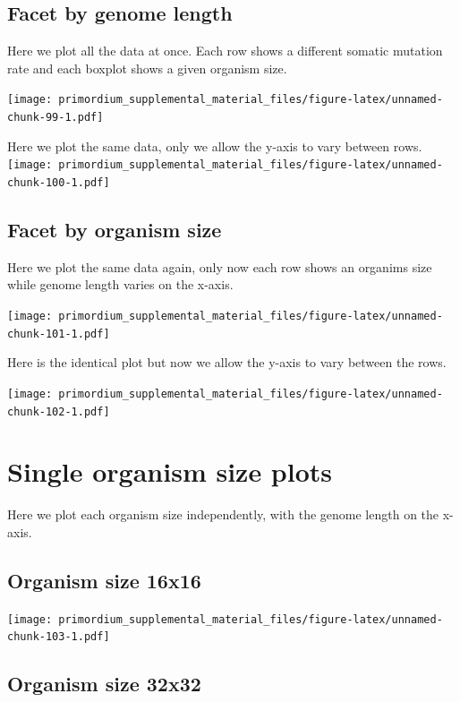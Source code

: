 \documentclass[]{book}
\begin{document}
\hypertarget{facet-by-genome-length-1}{%
\subsection{Facet by genome length}\label{facet-by-genome-length-1}}

Here we plot all the data at once.
Each row shows a different somatic mutation rate and each boxplot shows a given organism size.

\texttt{[image: primordium\_supplemental\_material\_files/figure-latex/unnamed-chunk-99-1.pdf]}

Here we plot the same data, only we allow the y-axis to vary between rows.
\texttt{[image: primordium\_supplemental\_material\_files/figure-latex/unnamed-chunk-100-1.pdf]}

\hypertarget{facet-by-organism-size-3}{%
\subsection{Facet by organism size}\label{facet-by-organism-size-3}}

Here we plot the same data again, only now each row shows an organims size while genome length varies on the x-axis.

\texttt{[image: primordium\_supplemental\_material\_files/figure-latex/unnamed-chunk-101-1.pdf]}

Here is the identical plot but now we allow the y-axis to vary between the rows.

\texttt{[image: primordium\_supplemental\_material\_files/figure-latex/unnamed-chunk-102-1.pdf]}

\hypertarget{single-organism-size-plots-4}{%
\section{Single organism size plots}\label{single-organism-size-plots-4}}

Here we plot each organism size independently, with the genome length on the x-axis.

\hypertarget{organism-size-16x16-3}{%
\subsection{Organism size 16x16}\label{organism-size-16x16-3}}

\texttt{[image: primordium\_supplemental\_material\_files/figure-latex/unnamed-chunk-103-1.pdf]}

\hypertarget{organism-size-32x32-3}{%
\subsection{Organism size 32x32}\label{organism-size-32x32-3}}
\end{document}
